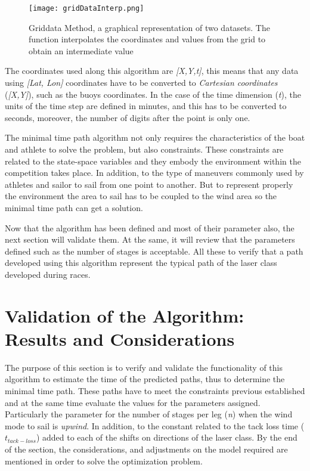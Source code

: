 \begin{figure}[hbt!]
    \centering
    \texttt{[image: gridDataInterp.png]}
    \caption{Griddata Method, a graphical representation of two datasets. The function interpolates the coordinates and values from the grid to obtain an intermediate value}
    \label{fig:gridDataInterpo}
\end{figure}

The coordinates used along this algorithm are \textit{[X,Y,t]}, this means that any data using \textit{[Lat, Lon]} coordinates have to be converted to \textit{Cartesian coordinates} (\textit{[X,Y]}), such as the buoys coordinates. In the case of the time dimension (\textit{t}), the units of the time step are defined in minutes, and this has to be converted to seconds, moreover, the number of digits after the point is only one. \par

The minimal time path algorithm not only requires the characteristics of the boat and athlete to solve the problem, but also constraints. These constraints are related to the state-space variables and they embody the environment within the competition takes place. In addition, to the type of maneuvers commonly used by athletes and sailor to sail from one point to another. But to represent properly the environment the area to sail has to be coupled to the wind area so the minimal time path can get a solution. \par \noindent 
Now that the algorithm has been defined and most of their parameter also, the next section will validate them. At the same, it will review that the parameters defined such as the number of stages is acceptable. All these to verify that a path developed using this algorithm represent the typical path of the laser class developed during races. \par %
\section{Validation of the Algorithm: Results and Considerations}
\label{sec:ValidationAlgo}

The purpose of this section is to verify and validate the functionality of this algorithm to estimate the time of the predicted paths, thus to determine the minimal time path. These paths have to meet the constraints previous established and at the same time evaluate the values for the parameters assigned. Particularly the parameter for the number of stages per leg (\textit{n}) when the wind mode to sail is \textit{upwind}. In addition, to the constant related to the tack loss time ($t_{tack-loss}$) added to each of the shifts on directions of the laser class. By the end of the section, the considerations, and adjustments on the model required are mentioned in order to solve the optimization problem.  \par 

